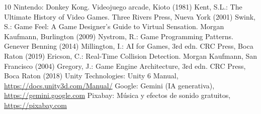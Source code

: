 \documentclass[runningheads]{llncs}
\begin{document}
\begin{thebibliography}{10}
 Nintendo: Donkey Kong. Videojuego arcade, Kioto (1981)
 Kent, S.L.: The Ultimate History of Video Games. Three Rivers Press, Nueva York (2001)
 Swink, S.: Game Feel: A Game Designer's Guide to Virtual Sensation. Morgan Kaufmann,
Burlington (2009)
 Nystrom, R.: Game Programming Patterns. Genever Benning (2014)
 Millington, I.: AI for Games, 3rd edn. CRC Press, Boca Raton (2019)
 Ericson, C.: Real-Time Collision Detection. Morgan Kaufmann, San Francisco (2004)
 Gregory, J.: Game Engine Architecture, 3rd edn. CRC Press, Boca Raton (2018)
 Unity Technologies: Unity 6 Manual, \url{https://docs.unity3d.com/Manual/}
 Google: Gemini (IA generativa), \url{https://gemini.google.com}
 Pixabay: Música y efectos de sonido gratuitos, \url{https://pixabay.com}
\end{thebibliography}
\end{document}
